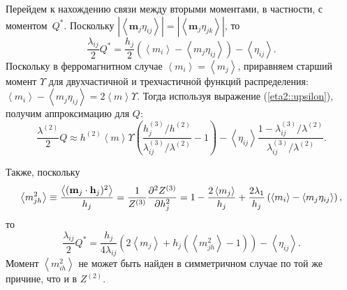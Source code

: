 \documentclass[12pt]{article}
\def\m{\mathbf m{}}
\def\h{{\bf h}}
\def\sr#1{\left<#1\right>}
\def\ZV{Z^{(2)}}
\def\ZW{Z^{(3)}}
\begin{document}
Перейдем к нахождению связи между вторыми моментами, в частности, с моментом~$Q^*$. Поскольку $|\sr{\m_j \eta_{ij}}| = |\sr{\m_j \eta_{jk}}|$, то
\begin{equation}
    \frac{\lambda_{ij}}{2}Q^* = \frac{h_j}{2}\left(\left<{m_i}\right> - \left<{m_j\eta_{ij}}\right>\right) - \left<{\eta_{ij}}\right>.
\end{equation}
Поскольку в ферромагнитном случае $\sr{m_i} = \sr{m_j}$, приравняем старший момент $\Upsilon$ для двухчастичной и трехчастичной функций распределения: $\left<{m_i}\right> - \left<{m_j\eta_{ij}}\right> = 2 \sr m \Upsilon$. Тогда используя выражение (\ref{eta2::upsilon}), получим аппроксимацию для $Q$:
\begin{equation}\label{Q::approx}
    \frac{\lambda^{(2)}}{2}Q \approx h^{(2)} \sr m \Upsilon \left(\frac{h_j^{(3)} / h^{(2)}}{\lambda_{ij}^{(3)} / \lambda^{(2)}}-1\right) - \sr{\eta_{ij}}\frac{1-\lambda_{ij}^{(3)} / \lambda^{(2)}}{\lambda_{ij}^{(3)} / \lambda^{(2)}}.
\end{equation}

Также, поскольку
\begin{equation}
    \sr{m_{jh}^2} \equiv \frac{\sr{(\m_j \cdot \h_j)^2}}{h_j} = \frac{1}{\ZW} \frac{\partial^2 \ZW}{\partial h_j^2} = 1 - \frac{2 \left<{m_j}\right>}{h_j} + \frac{2\lambda_{1}}{h_j}\left(\left<{m_i}\right> - \left<{m_j\eta_{ij}}\right>\right),
\end{equation}
то
\begin{equation}
    \frac{\lambda_{ij}}{2}Q^* = \frac{h_j}{4\lambda_{ij}} \left(2 \left<{m_j}\right> + h_j(\left<m_{jh}^2\right> - 1)\right) - \left<{\eta_{ij}}\right>.
\end{equation}
Момент $\sr{m_{ih}^2}$ не может быть найден в симметричном случае по той же причине, что и в $\ZV$.
\end{document}
